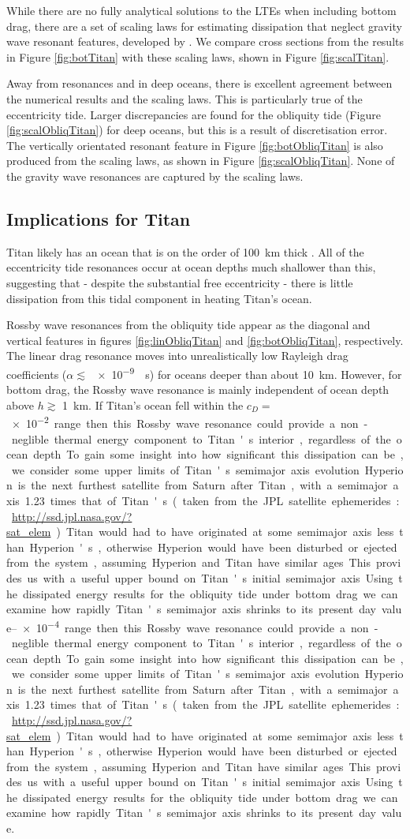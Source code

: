 While there are no fully analytical solutions to the LTEs when including bottom drag, there are a set of scaling laws for estimating dissipation that neglect gravity wave resonant features, developed by \citet{chen2013tidal}. We compare cross sections from the results in Figure \ref{fig:botTitan} with these scaling laws, shown in Figure \ref{fig:scalTitan}.

Away from resonances and in deep oceans, there is excellent agreement between the numerical results and the scaling laws. This is particularly true of the eccentricity tide. Larger discrepancies are found for the obliquity tide (Figure \ref{fig:scalObliqTitan}) for deep oceans, but this is a result of discretisation error. The vertically orientated resonant feature in Figure \ref{fig:botObliqTitan} is also produced from the scaling laws, as shown in Figure \ref{fig:scalObliqTitan}. None of the gravity wave resonances are captured by the scaling laws. 

\subsection{Implications for Titan}

Titan likely has an ocean that is on the order of \SI{100}{\kilo\metre} thick \citep{sohl2014structural,baland2014titan}. All of the eccentricity tide resonances occur at ocean depths much shallower than this, suggesting that - despite the substantial free eccentricity - there is little dissipation from this tidal component in heating Titan's ocean.

Rossby wave resonances from the obliquity tide appear as the diagonal and vertical features in figures \ref{fig:linObliqTitan} and \ref{fig:botObliqTitan}, respectively. The linear drag resonance moves into unrealistically low Rayleigh drag coefficients ($\alpha \lesssim$ \SI{e-9}{\per\second}) for oceans deeper than about \SI{10}{\kilo\metre}. However, for bottom drag, the Rossby wave resonance is mainly independent of ocean depth above $h \gtrsim$ \SI{1}{\kilo\metre}. If Titan's ocean fell within the $c_D =$ \SIrange{e-2}{e-4} range then this Rossby wave resonance could provide a non-neglible thermal energy component to Titan's interior, regardless of the ocean depth. To gain some insight into how significant this dissipation can be, we consider some upper limits of Titan's semimajor axis evolution.

Hyperion is the next furthest satellite from Saturn after Titan, with a semimajor axis  \num{1.23} times that of Titan's (taken from the JPL satellite ephemerides: \url{http://ssd.jpl.nasa.gov/?sat_elem}). Titan would had to have originated at some semimajor axis less than Hyperion's, otherwise Hyperion would have been disturbed or ejected from the system, assuming Hyperion and Titan have similar ages. This provides us with a useful upper bound on Titan's  initial semimajor axis. Using the dissipated energy results for the obliquity tide under bottom drag we can examine how rapidly Titan's semimajor axis shrinks to its present day value.

